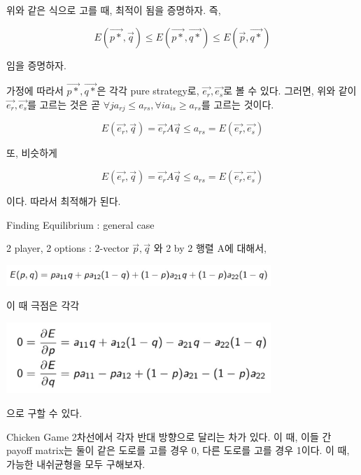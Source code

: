 \documentclass{beamer}
\begin{document}
\begin{frame}
위와 같은 식으로 고를 때, 최적이 됨을 증명하자. 즉, 

\begin{equation} 
E(\vec{p*}, \vec{q}) \leq E(\vec{p*}, \vec{q*}) \leq E(\vec{p}, \vec{q*}) 
\end{equation}

임을 증명하자. 

가정에 따라서  $\vec{p*}, \vec{q*}$은 각각 pure strategy로, $\vec{e_r}, \vec{e_s}$로 볼 수 있다. 그러면, 위와 같이 $\vec{e_r}, \vec{e_s}$를 고르는 것은 곧 $\forall j a_{rj} \leq a_{rs}, \forall i a_{is} \geq a_{rs}$를 고르는 것이다. 


\begin{equation} 
E(\vec{e_r}, \vec{q}) = \vec{e_r}A\vec{q} \leq a_{rs} = E(\vec{e_r}, \vec{e_s})
\end{equation}

또, 비슷하게 

\begin{equation} 
E(\vec{e_r}, \vec{q}) = \vec{e_r}A\vec{q} \leq a_{rs} = E(\vec{e_r}, \vec{e_s})
\end{equation}

이다. 따라서 최적해가 된다. 


\end{frame}



\begin{frame}{Finding Equilibrium : general case}

2 player, 2 options : 2-vector $\vec{p}, \vec{q}$ 와 2 by 2 행렬 A에 대해서, 

\includegraphics[width=10cm,keepaspectratio]{exp}

이 때 극점은 각각 

\includegraphics[width=10cm,keepaspectratio]{crit}

으로 구할 수 있다. 
\end{frame} 


\begin{frame}{Chicken Game} 
2차선에서 각자 반대 방향으로 달리는 차가 있다. 이 때, 이들 간 payoff matrix는 둘이 같은 도로를 고를 경우 0, 다른 도로를 고를 경우 1이다. 이 때, 가능한 내쉬균형을 모두 구해보자. 
\end{frame}
\end{document}
